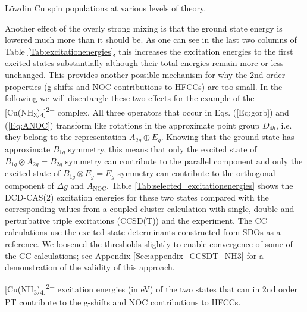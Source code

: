 \begin{table}
\small
\centering
\ttabbox
{\caption{Löwdin Cu spin populations at various levels of theory.}
\label{Tab:spinpopulations}}
{}
\end{table}
Another effect of the overly strong mixing is that the ground state energy is lowered much more than it should be. As one can see in the last two columns of Table \ref{Tab:excitationenergies}, this increases the excitation energies to the first excited states substantially although their total energies remain more or less unchanged. This provides another possible mechanism for why the 2nd order properties (g-shifts and NOC contributions to HFCCs) are too small.
In the following we will disentangle these two effects for the example of the [Cu(NH\textsubscript{3})\textsubscript{4}]\textsuperscript{2+} complex. All three operators that occur in Eqs. (\ref{Eq:gorb}) and (\ref{Eq:ANOC}) transform like rotations in the approximate point group $D_{4h}$, i.e. they belong to the representation ${A_{2g}} \oplus {E_g}$. Knowing that the ground state has approximate ${B_{1g}}$ symmetry, this means that only the excited state of ${B_{1g}} \otimes {A_{2g}} = {B_{2g}}$ symmetry can contribute to the parallel component and only the excited state of ${B_{1g}} \otimes {E_g} = {E_g}$ symmetry can contribute to the orthogonal component of $\Delta g$ and ${A_{{\text{NOC}}}}$. Table \ref{Tab:selected_excitationenergies} shows the DCD-CAS(2) excitation energies for these two states compared with the corresponding values from a coupled cluster calculation with single, double and perturbative triple excitations (CCSD(T)) and the experiment. The CC calculations use the excited state determinants constructed from SDOs as a reference. We loosened the thresholds slightly to enable convergence of some of the CC calculations; see Appendix \ref{Sec:appendix_CCSDT_NH3} for a demonstration of the validity of this approach.
\begin{table}
\small
\centering
\ttabbox
{\caption[{[Cu(NH\textsubscript{3})\textsubscript{4}]}\textsuperscript{2+} excitation energies of the two states that can in 2nd order contribute to the g-shifts and HFCCs.]{[Cu(NH\textsubscript{3})\textsubscript{4}]\textsuperscript{2+} excitation energies (in eV) of the two states that can in 2nd order PT contribute to the g-shifts and NOC contributions to HFCCs.}
\label{Tab:selected_excitationenergies}}
{}

\end{table}
